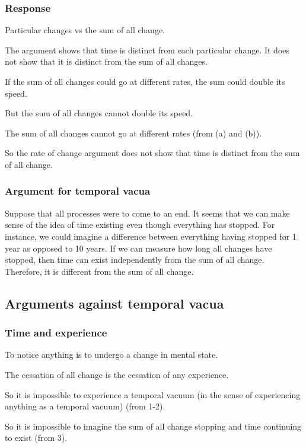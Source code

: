 \documentclass[oneside]{article}
\begin{document}
\subsubsection*{Response}
\begin{enumerate*}
\item Particular changes vs the sum of all change. 
\item The argument shows that time is distinct from each particular change. It does not show that it is distinct from the sum of all changes. 
\begin{enumerate*}

\item If the sum of all changes could go at different rates, the sum could double its speed. 
\item But the sum of all changes cannot double its speed.
\item The sum of all changes cannot go at different rates (from (a) and (b)).  
\end{enumerate*}
\item So the rate of change argument does not show that time is distinct from the sum of all change.
\end{enumerate*}

\subsubsection*{Argument for temporal vacua}

Suppose that all processes were to come to an end. It seems that we can make sense of the idea of time existing even though everything has stopped. For instance, we could imagine a difference between everything having stopped for 1 year as opposed to 10 years. If we can measure how long all changes have stopped, then time can exist independently from the sum of all change. Therefore, it is different from the sum of all change.

\subsection*{Arguments against temporal vacua}

\subsubsection*{Time and experience}
\begin{enumerate*}
\item To notice anything is to undergo a change in mental state.
\item The cessation of all change is the cessation of any experience. 
\item So it is impossible to experience a temporal vacuum (in the sense of experiencing anything as a temporal vacuum) (from 1-2). 
\item So it is impossible to imagine the sum of all change stopping and time continuing to exist (from 3). 
\end{enumerate*}
\end{document}
